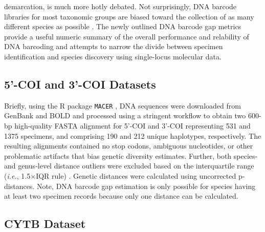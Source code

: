 \documentclass[12pt]{article}
\begin{document}
demarcation, is much more hotly debated. Not surprisingly, DNA barcode libraries for most taxonomic groups are biased toward the collection of as many different species as possible \citep{phillips2015exploration, phillips2019incomplete, phillips2022lack}. The newly outlined DNA barcode gap metrics provide a useful numeric summary of the overall performance and relability of DNA barcoding and attempts to narrow the divide between specimen identification and species discovery using single-locus molecular data.

\subsection{5'-COI and 3'-COI Datasets}

Briefly, using the R package {\tt MACER} \citep{young2021macer}, DNA sequences were downloaded from GenBank and BOLD and processed using a stringent workflow to obtain two 600-bp high-quality FASTA alignment for 5'-COI and 3'-COI representing 531 and 1375 specimens, and comprising 190 and 212 unique haplotypes, respectively. The resulting alignments contained no stop codons, ambiguous nucleotides, or other problematic artifacts that bias genetic diversity estimates. Further, both species- and genus-level distance outliers were excluded based on the interquartile range (\textit{i.e.}, 1.5$\times$IQR rule) \citep{young2021macer}. Genetic distances were calculated using uncorrected p-distances. Note, DNA barcode gap estimation is only possible for species having at least two specimen records because only one distance can be calculated.

\subsection{CYTB Dataset}
\end{document}

